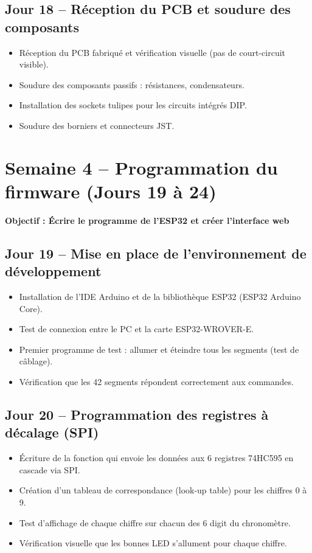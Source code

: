\documentclass[12pt,a4paper]{article}
\begin{document}
\subsection*{Jour 18 -- Réception du PCB et soudure des composants}
\begin{itemize}
    \item Réception du PCB fabriqué et vérification visuelle (pas de court-circuit visible).
    \item Soudure des composants passifs : résistances, condensateurs.
    \item Installation des sockets tulipes pour les circuits intégrés DIP.
    \item Soudure des borniers et connecteurs JST.
\end{itemize}

\newpage

\section{Semaine 4 -- Programmation du firmware (Jours 19 à 24)}

\colorbox{semaine4}{\parbox{\linewidth}{\centering\textbf{Objectif : Écrire le programme de l'ESP32 et créer l'interface web}}}

\bigskip

\subsection*{Jour 19 -- Mise en place de l'environnement de développement}
\begin{itemize}
    \item Installation de l'IDE Arduino et de la bibliothèque ESP32 (ESP32 Arduino Core).
    \item Test de connexion entre le PC et la carte ESP32-WROVER-E.
    \item Premier programme de test : allumer et éteindre tous les segments (test de câblage).
    \item Vérification que les 42 segments répondent correctement aux commandes.
\end{itemize}

\subsection*{Jour 20 -- Programmation des registres à décalage (SPI)}
\begin{itemize}
    \item Écriture de la fonction qui envoie les données aux 6 registres 74HC595 en cascade via SPI.
    \item Création d'un tableau de correspondance (look-up table) pour les chiffres 0 à 9.
    \item Test d'affichage de chaque chiffre sur chacun des 6 digit du chronomètre.
    \item Vérification visuelle que les bonnes LED s'allument pour chaque chiffre.
\end{itemize}
\end{document}
